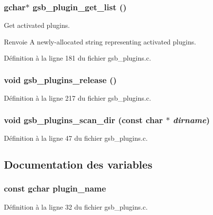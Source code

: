 \subsubsection[{gsb\_\-plugin\_\-get\_\-list}]{\setlength{\rightskip}{0pt plus 5cm}gchar$\ast$ gsb\_\-plugin\_\-get\_\-list ()}\label{gsb__plugins_8c_a9f59967389b32ce61da777570db3bd70}
Get activated plugins.

\begin{DoxyReturn}{Renvoie}
A newly-\/allocated string representing activated plugins. 
\end{DoxyReturn}


Définition à la ligne 181 du fichier gsb\_\-plugins.c.

\subsubsection[{gsb\_\-plugins\_\-release}]{\setlength{\rightskip}{0pt plus 5cm}void gsb\_\-plugins\_\-release ()}\label{gsb__plugins_8c_afc5867729924c1aeef67629c66ce5020}


Définition à la ligne 217 du fichier gsb\_\-plugins.c.

\subsubsection[{gsb\_\-plugins\_\-scan\_\-dir}]{\setlength{\rightskip}{0pt plus 5cm}void gsb\_\-plugins\_\-scan\_\-dir (const char $\ast$ {\em dirname})}\label{gsb__plugins_8c_a63124d64ba3d44f175f5c30ee608c1b0}


Définition à la ligne 47 du fichier gsb\_\-plugins.c.



\subsection{Documentation des variables}
\subsubsection[{plugin\_\-name}]{\setlength{\rightskip}{0pt plus 5cm}const gchar {\bf plugin\_\-name}}\label{gsb__plugins_8c_a9c0a4e4352c3f21cf8b861e4db8c756f}


Définition à la ligne 32 du fichier gsb\_\-plugins.c.

